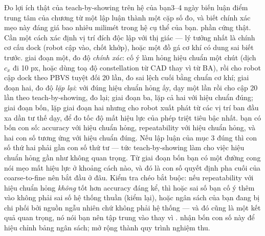 \documentclass[../../marker.tex]{subfiles}
\begin{document}
\begin{duan}{Đo lợi ích thật của teach-by-showing trên hệ của bạn}{3--4 ngày}
\dmt biến luận điểm trung tâm của chương từ một lập luận thành một cặp số đo, và biết chính xác mẹo này đáng giá bao nhiêu milimét trong hệ cụ thể của bạn.
\ddl phần cứng thật. Cần một cách xác định vị trí đích độc lập với thị giác --- lý tưởng nhất là chính cơ cấu dock (robot cập vào, chốt khớp), hoặc một đồ gá cơ khí có dung sai biết trước.
\dbc giai đoạn một, đo độ \emph{chính xác}: cố ý làm hỏng hiệu chuẩn một chút (dịch \(c_x\) đi 10 px, hoặc dùng toạ độ constellation từ CAD thay vì từ BA), rồi cho robot cập dock theo PBVS tuyệt đối 20 lần, đo sai lệch cuối bằng chuẩn cơ khí; giai đoạn hai, đo độ \emph{lặp lại}: với đúng hiệu chuẩn hỏng ấy, dạy một lần rồi cho cập 20 lần theo teach-by-showing, đo lại; giai đoạn ba, lặp cả hai với hiệu chuẩn đúng; giai đoạn bốn, lặp giai đoạn hai nhưng cho robot xuất phát từ các vị trí ban đầu xa dần tư thế dạy, để đo tốc độ mất hiệu lực của phép triệt tiêu bậc nhất.
\dxk bạn có bốn con số: accuracy với hiệu chuẩn hỏng, repeatability với hiệu chuẩn hỏng, và hai con số tương ứng với hiệu chuẩn đúng. Nếu lập luận của mục 3 đúng thì con số thứ hai phải gần con số thứ tư --- tức teach-by-showing làm cho việc hiệu chuẩn hỏng gần như không quan trọng. Từ giai đoạn bốn bạn có một đường cong nói mẹo mất hiệu lực ở khoảng cách nào, và đó là con số quyết định pha cuối của coarse-to-fine nên bắt đầu ở đâu. Kiểm tra chéo bắt buộc: nếu repeatability với hiệu chuẩn hỏng \emph{không} tốt hơn accuracy đáng kể, thì hoặc sai số bạn cố ý thêm vào không phải sai số hệ thống thuần (kiểm lại), hoặc ngân sách của bạn đang bị chi phối bởi nguồn ngẫu nhiên chứ không phải hệ thống --- và đó cũng là một kết quả quan trọng, nó nói bạn nên tập trung vào  thay vì .
\dnv {} nhận bốn con số này để hiệu chỉnh bảng ngân sách;  mở rộng thành quy trình nghiệm thu.
\end{duan}
\end{document}
